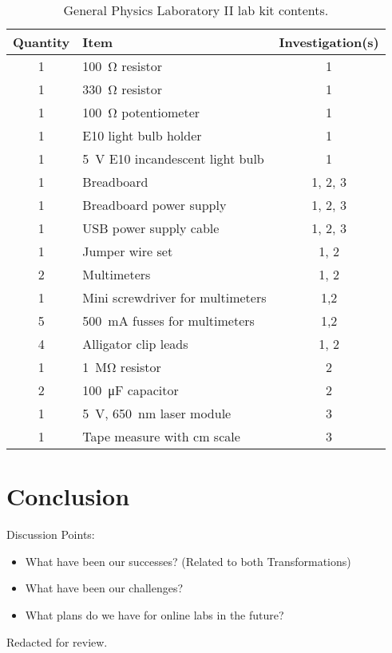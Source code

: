 \documentclass[aip, numerical, preprint]{revtex4-2}
\begin{document}
\begin{table}
  \caption{\label{tab: 1261 lab kit} General Physics Laboratory II lab kit contents.}
  \begin{tabular}{clc}
    \hline\hline
    Quantity & Item & Investigation(s)\\
    \hline
    1 & \SI{100}{\ohm} resistor & 1 \\
    1 & \SI{330}{\ohm} resistor & 1 \\
    1 &  \SI{100}{\ohm} potentiometer & 1 \\
    1 & E10 light bulb holder & 1 \\
    1 & \SI{5}{V} E10 incandescent light bulb & 1 \\
    1 & Breadboard & 1, 2, 3 \\
    1 & Breadboard power supply & 1, 2, 3 \\
    1 & USB power supply cable & 1, 2, 3 \\
    1 & Jumper wire set & 1, 2 \\
    2 & Multimeters & 1, 2 \\
    1 & Mini screwdriver for multimeters & 1,2 \\
    5 & \SI{500}{mA} fusses for multimeters & 1,2 \\
    4 & Alligator clip leads & 1, 2 \\
    1 & \SI{1}{\mega\ohm} resistor & 2 \\
    2 & \SI{100}{\micro\farad} capacitor & 2 \\
    1 & \SI{5}{V}, \SI{650}{nm} laser module & 3 \\
    1 & Tape measure with cm scale & 3 \\            
    \hline\hline
  \end{tabular}
\end{table}


\section{Conclusion}
Discussion Points:
\begin{itemize}
  \item What have been our successes?  (Related to both Transformations)
  \item What have been our challenges?
  \item What plans do we have for online labs in the future?
\end{itemize}



\begin{acknowledgments}
  Redacted for review.%
\end{acknowledgments}


\end{document}
